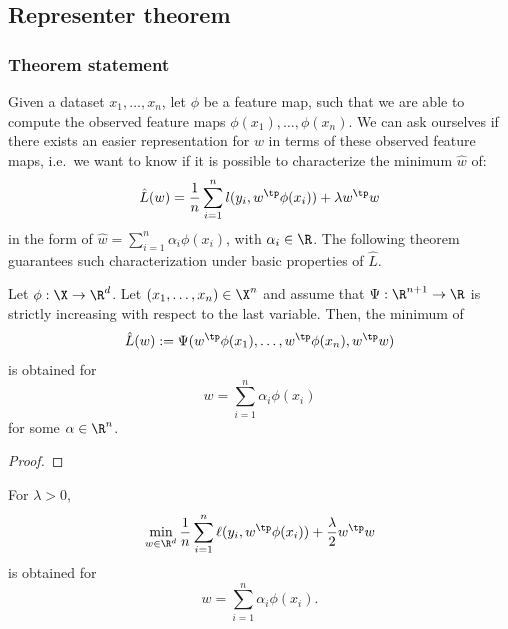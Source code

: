 \documentclass[toc, titlepaged]{../cs-classes/cs-classes}
\begin{document}
\subsection{Representer theorem}
\subsubsection{Theorem statement}
Given a dataset $x_1, \dots, x_n$, let $\phi$ be a feature map, such that we are able to compute the observed feature maps $\phi(x_1), \dots, \phi(x_n)$. We can ask ourselves if there exists an easier representation for $w$ in terms of these observed feature maps, i.e.~we want to know if it is possible to characterize the minimum $\hat{w}$ of:
\begin{equation*}
    \hat{L}(w) = \frac{1}{n}\sum_{i=1}^n l(y_i, w^\tp\phi(x_i)) + \lambda w^\tp w
\end{equation*}
in the form of $\hat{w} = \sum_{i=1}^n \alpha_i\phi(x_i)$, with $\alpha_i\in\R$. The following theorem guarantees such characterization under basic properties of $\hat{L}$.

\begin{theorem}
    Let $\phi:\X\to\R^d$. Let $(x_1, \dots, x_n)\in\X^n$ and assume that $\Psi:\R^{n+1}\to\R$ is strictly increasing with respect to the last variable. Then, the minimum of
    \begin{equation*}
        \hat{L}(w) := \Psi(w^\tp\phi(x_1), \dots, w^\tp\phi(x_n), w^\tp w)
    \end{equation*}
    is obtained for
    \begin{equation*}
        w=\sum_{i=1}^n \alpha_i \phi(x_i)
    \end{equation*} for some $\alpha\in\R^n$.
\end{theorem}

\begin{proof}
\end{proof}

\begin{corollary}
    For $\lambda>0$, 
    \begin{equation*}
        \min_{w\in\R^d} \frac{1}{n} \sum_{i=1}^n \ell(y_i, w^\tp\phi(x_i)) + \frac{\lambda}{2} w^\tp w
    \end{equation*}
    is obtained for
    \begin{equation*}
        w = \sum_{i=1}^n \alpha_i\phi(x_i).
    \end{equation*}
\end{corollary}
\end{document}
